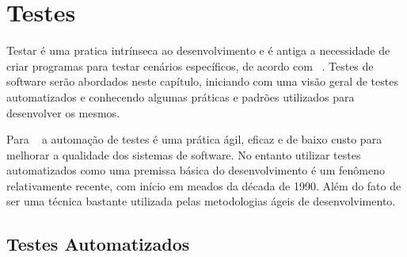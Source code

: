 
\chapter{Testes}
\label{cap:testes}

Testar é uma pratica intrínseca ao desenvolvimento e é antiga a necessidade de
criar programas para testar cenários específicos, de acordo com ~.
%
Testes de software serão abordados neste capítulo, iniciando com uma visão geral de testes 
automatizados e conhecendo algumas práticas e padrões utilizados para desenvolver
os mesmos.

Para ~ a automação de testes é uma prática ágil, eficaz e de baixo custo para melhorar
a qualidade dos sistemas de software. No entanto utilizar testes automatizados 
como uma premissa básica do desenvolvimento é um fenômeno relativamente recente, 
com início em meados  da década de 1990. Além do fato de ser uma técnica bastante utilizada pelas metodologias ágeis
de desenvolvimento.


\section{Testes Automatizados}

